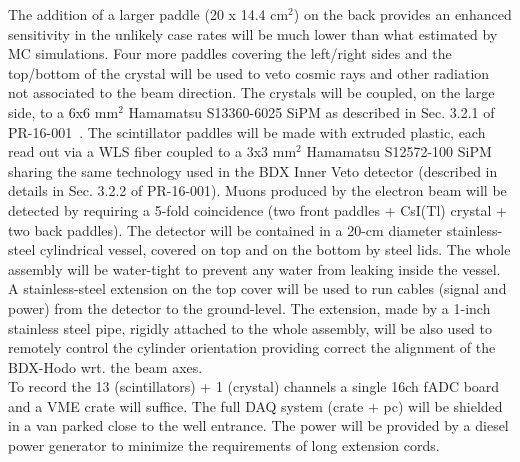 The addition of a larger paddle (20 x 14.4 cm$^2$) on the back provides an enhanced sensitivity   in the unlikely  case rates will be much lower than what estimated by MC simulations.
Four more  paddles covering  the left/right sides and the top/bottom of the crystal will be used to veto cosmic rays and other radiation not associated to the beam direction.
The crystals will be coupled, on the large side,  to a 6x6 mm$^2$ Hamamatsu S13360-6025 SiPM as described in Sec. 3.2.1 of  PR-16-001~\cite{bdx-proposal}. The scintillator paddles will be  made with extruded plastic, each  read out via a WLS fiber coupled to a 3x3 mm$^2$ Hamamatsu S12572-100 SiPM sharing the same technology used in the BDX Inner Veto detector (described in details in Sec. 3.2.2 of  PR-16-001).
Muons produced by the electron beam will be detected by requiring a 5-fold coincidence (two front paddles + CsI(Tl) crystal + two back  paddles).
The detector will be contained  in a 20-cm diameter stainless-steel cylindrical vessel, covered on top and on the bottom by steel lids. The whole assembly will  be water-tight to prevent any water from leaking inside the vessel. A stainless-steel  extension on the top cover will be used  to run  cables (signal and power)  from the detector to the ground-level. The extension, made by a 1-inch stainless steel pipe,  rigidly attached to the whole assembly, will be also used  to remotely control the cylinder orientation  providing correct  the alignment of the BDX-Hodo wrt. the beam axes. \\
To record the 13 (scintillators) + 1 (crystal) channels a  single 16ch  fADC board and  a VME crate will suffice. The full DAQ system (crate + pc)  will be shielded in a van parked close to the well entrance. The power will be provided by a diesel power generator to minimize the requirements of long extension cords.

